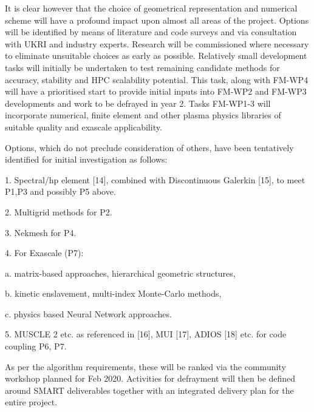 \documentclass{article}
\begin{document}
\vspace{24pt}
It is clear however that the choice of geometrical representation and numerical 
scheme will have a profound impact upon almost all areas of the project. Options 
will be identified by means of literature and code surveys and via consultation 
with UKRI and industry experts. Research will be commissioned where necessary to 
eliminate unsuitable choices as early as possible. Relatively small development 
tasks will initially be undertaken to test remaining candidate methods for accuracy, 
stability and HPC scalability potential.  This task, along with FM-WP4 will have 
a prioritised start to provide initial inputs into FM-WP2 and FM-WP3 developments 
and work to be defrayed in year 2. Tasks FM-WP1-3 will incorporate numerical, finite 
element and other plasma physics libraries of suitable quality and exascale applicability.

\vspace{24pt}
O\label{HHlk22042124}ptions, which do not preclude consideration of others, have 
been tentatively identified for initial investigation as follows:

\vspace{24pt}
\leftskip=0pt
1. Spectral/hp {\color{color29} element [14], combined }with Discontinuous {\color{color29} Galerkin 
[15], to }meet P1,P3 and possibly P5 above.

\vspace{12pt}
2. Multigrid methods for P2.

\vspace{12pt}
3. Nekmesh for P4.

\vspace{12pt}
4. For Exascale (P7):

\vspace{12pt}
a. matrix-based approaches, hierarchical geometric structures,

\vspace{12pt}
b. kinetic enslavement, multi-index Monte-Carlo methods,

\vspace{12pt}
c. physics based Neural Network approaches.

\vspace{12pt}
{\color{color29} 5. MUSCLE 2 etc. as referenced in [16], MUI [17], ADIOS [18] etc. 
for code }coupling P6, P7.

\vspace{24pt}
\leftskip=-14pt
As per the algorithm requirements, these will be ranked via the community workshop 
planned for Feb 2020. Activities for defrayment will then be defined around SMART 
deliverables together with an integrated delivery plan for the entire project.\label{}
\end{document}
